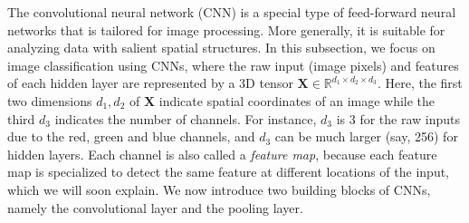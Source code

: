 The convolutional neural network (CNN) \citep{lecun1998gradient, fukushima1982neocognitron} is a special type of feed-forward neural networks that is tailored for image processing. More generally, it is suitable for analyzing data with salient spatial structures. In this subsection, we focus on image classification using CNNs, where the raw input (image pixels) and features of each hidden layer are represented by a 3D tensor $\bm{X}\in\mathbb{R}^{d_{1}\times d_{2}\times d_{3}}$. Here, the first two dimensions $d_1, d_2$ of $\bm{X}$ indicate spatial coordinates of an image while the third $d_3$ indicates the number of channels. For instance, $d_3$ is $3$ for the raw inputs due to the red, green and blue channels, and $d_3$ can be much larger (say, 256) for hidden layers. Each channel is also called a \textit{feature map}, because each feature map is specialized to detect the same feature at different locations of the input, which we will soon explain. %
We now introduce two building blocks of CNNs, namely the convolutional layer and the pooling layer.
